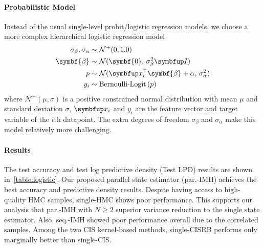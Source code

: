 
%

\vspace{-0.1in}
\paragraph{Probabilistic Model}
Instead of the usual single-level probit/logistic regression models, we choose a more complex hierarchical logistic regression model 
%
\begin{align*}
\sigma_{\beta}, \sigma_{\alpha} &\sim \mathcal{N}^{+}(0, 1.0) \\
\symbf{\beta} &\sim \mathcal{N}(\symbf{0},\, \sigma_{\beta}^2 \mI) \\
p &\sim \mathcal{N}(\vx_i^{\top}\symbf{\beta} + \alpha,\, \sigma_{\alpha}^2) \\
y_i &\sim \text{Bernoulli-Logit}\,(p)
\end{align*}
%
where \(\mathcal{N}^+(\mu, \sigma)\) is a positive constrained normal distribution with mean \(\mu\) and standard deviation \(\sigma\), \(\vx_i\) and \(y_i\) are the feature vector and target variable of the \(i\)th datapoint.
The extra degrees of freedom \(\sigma_{\beta}\) and \(\sigma_{\alpha}\) make this model relatively more challenging.

\vspace{-0.05in}
\paragraph{Results}
The test accuracy and test log predictive density (Test LPD) results are shown in~\cref{table:logistic}.
Our proposed parallel state estimator (par.-IMH) achieves the best accuracy and predictive density results.
Despite having access to high-quality HMC samples, single-HMC shows poor performance.
This supports our analysis that par.-IMH with \(N \geq 2\) superior variance reduction to the single state estimator.
Also, seq.-IMH showed poor performance overall due to the correlated samples.
Among the two CIS kernel-based methods, single-CISRB performs only marginally better than single-CIS.

